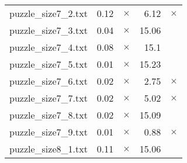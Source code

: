 \documentclass{article}
\begin{document}
\begin{center}
\begin{tabular}{lrrrr}
\\
puzzle\_size7\_2.txt & 0.12 & 
$\times$
 & 6.12 & 
$\times$
\\
puzzle\_size7\_3.txt & 0.04 & 
$\times$
 & 15.06 & 
\\
puzzle\_size7\_4.txt & 0.08 & 
$\times$
 & 15.1 & 
\\
puzzle\_size7\_5.txt & 0.01 & 
$\times$
 & 15.23 & 
\\
puzzle\_size7\_6.txt & 0.02 & 
$\times$
 & 2.75 & 
$\times$
\\
puzzle\_size7\_7.txt & 0.02 & 
$\times$
 & 5.02 & 
$\times$
\\
puzzle\_size7\_8.txt & 0.02 & 
$\times$
 & 15.09 & 
\\
puzzle\_size7\_9.txt & 0.01 & 
$\times$
 & 0.88 & 
$\times$
\\
puzzle\_size8\_1.txt & 0.11 & 
$\times$
 & 15.06 & 
\\
\hline\end{tabular}
\end{center}
\end{document}
